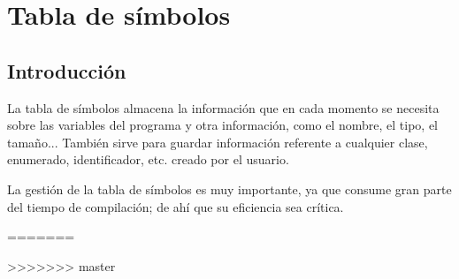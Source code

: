 \documentclass[11pt, english]{article}
\begin{document}
\newpage

\section{Tabla de símbolos}

\subsection{Introducción}

La tabla de símbolos almacena la información que en cada momento se necesita sobre las variables del programa y otra información, como el nombre, el tipo, el tamaño... También sirve para guardar información referente a cualquier clase, enumerado, identificador, etc. creado por el usuario.

La gestión de la tabla de símbolos es muy importante, ya que consume gran parte del tiempo de compilación; de ahí que su eficiencia sea crítica.

=======

	
>>>>>>> master
\end{document}
